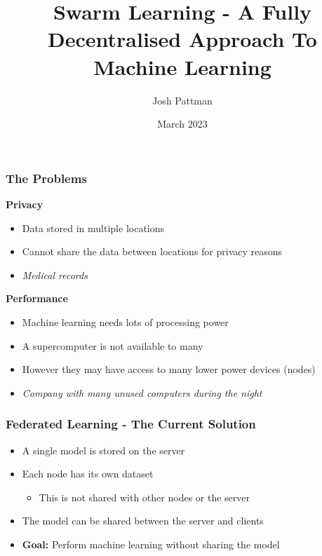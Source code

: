 \documentclass{beamer}
\title{Swarm Learning - A Fully Decentralised Approach To Machine Learning}
\author{Josh Pattman}
\institute{University Of Southampton}
\date{March 2023}
\begin{document}
	\frame{\titlepage}
	
	\begin{frame}
		\frametitle{The Problems}
		\textbf{Privacy}
		\begin{itemize}
			\item Data stored in multiple locations
			\item Cannot share the data between locations for privacy reasons
			\item \emph{Medical records}
		\end{itemize}
		
		\textbf{Performance}
		\begin{itemize}
			\item Machine learning needs lots of processing power
			\item A supercomputer is not available to many
			\item However they may have access to many lower power devices (nodes)
			\item \emph{Company with many unused computers during the night}
		\end{itemize}
	\end{frame}

	\begin{frame}
		\frametitle{Federated Learning - The Current Solution}
		\begin{itemize}
			\item A single model is stored on the server
			\item Each node has its own dataset
			\begin{itemize}
				\item This is not shared with other nodes or the server
			\end{itemize}
			\item The model can be shared between the server and clients
			\item \textbf{Goal:} Perform machine learning without sharing the model
		\end{itemize}
	\end{frame}
\end{document}
